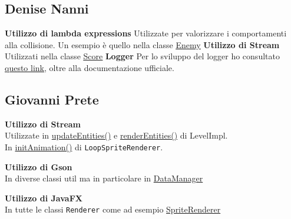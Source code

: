 \documentclass[a4paper,12pt]{report}
\begin{document}
\subsection{Denise Nanni}
\textbf{Utilizzo di lambda expressions}
\newline
Utilizzate per valorizzare i comportamenti alla collisione. Un esempio è quello nella classe
\href{https://github.com/dennnanni/UNIBOssfight/blob/61e1d141f734d2205d4e8b65fed0ebfc668a8357/UNIBOSSfight/src/main/java/app/core/entity/Enemy.java#L34}{\underline{Enemy}}
\newline
\textbf{Utilizzo di Stream}
\newline
Utilizzati nella classe \href{https://github.com/dennnanni/UNIBOssfight/blob/61e1d141f734d2205d4e8b65fed0ebfc668a8357/UNIBOSSfight/src/main/java/app/game/Score.java#L60}{\underline{Score}}
\newline
\textbf{Logger}
\newline
Per lo sviluppo del logger ho consultato \href{https://www.digitalocean.com/community/tutorials/logger-in-java-logging-example}{\underline{questo link}}, oltre alla documentazione ufficiale.

\subsection{Giovanni Prete}
\textbf{Utilizzo di Stream}\\
Utilizzate in \href{https://github.com/dennnanni/UNIBOssfight/blob/0768464f3f7be0d1f35435f89616902091c0b7a8/UNIBOSSfight/src/main/java/app/impl/level/LevelImpl.java#L72}{updateEntities()} e \href{https://github.com/dennnanni/UNIBOssfight/blob/0768464f3f7be0d1f35435f89616902091c0b7a8/UNIBOSSfight/src/main/java/app/impl/level/LevelImpl.java#L125}{renderEntities()} di LevelImpl.\\
In \href{https://github.com/dennnanni/UNIBOssfight/blob/0b788e3202136a52ea940d4dedaac28589c7eb66/UNIBOSSfight/src/main/java/app/impl/component/LoopSpriteRenderer.java#L76}{initAnimation()} di \texttt{LoopSpriteRenderer}.

\textbf{Utilizzo di Gson}\\
In diverse classi util ma in particolare in \href{https://github.com/dennnanni/UNIBOssfight/blob/0b788e3202136a52ea940d4dedaac28589c7eb66/UNIBOSSfight/src/main/java/app/util/DataManager.java}{DataManager}

\textbf{Utilizzo di JavaFX}\\
In tutte le classi \texttt{Renderer} come ad esempio \href{https://github.com/dennnanni/UNIBOssfight/blob/0b788e3202136a52ea940d4dedaac28589c7eb66/UNIBOSSfight/src/main/java/app/impl/component/SpriteRenderer.java#L55}{SpriteRenderer}\\
\end{document}
